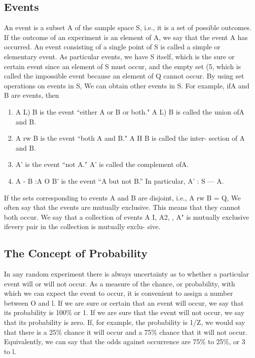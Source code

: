 \subsection*{Events}
An event is a subset A of the sample space S, i.e., it is a set of possible
outcomes. If the outcome of an experiment is an element of A, we say
that the event A has occurred. An event consisting of a single point of S
is called a simple or elementary event.
As particular events, we have S itself, which is the sure or certain
event since an element of S must occur, and the empty set (5, which is
called the impossible event because an element of Q cannot occur.
By using set operations on events in S, We can obtain other events
in S. For example, ifA and B are events, then
\begin{enumerate}
\item A L) B is the event “either A or B or both." A L) B is called the
union ofA and B.
\item A rw B is the event “both A and B." A H B is called the inter-
section of A and B.
\item A’ is the event “not A." A’ is called the complement ofA.
\item  A - B :A O B’ is the event “A but not B.” In particular, A’ :
S — A.
\end{enumerate}
If the sets corresponding to events A and B are disjoint, i.e., A rw B
= Q, We often say that the events are mutually exclusive. This means
that they cannot both occur. We say that a collection of events A I, A2,  ,
A" is mutually exclusive ifevery pair in the collection is mutually exclu-
sive.



\subsection*{The Concept of Probability}
In any random experiment there is always uncertainty as to whether a particular event will or will not occur. As a measure of the chance, or probability, with which we can expect the event to occur, it is convenient to assign a number between O and l. If we are sure or certain that an event will occur, we say that its probability is 100\% or 1. If we are
sure that the event will not occur, we say that its probability is zero. If, for example, the probability is 1/Z, we would say that there is a 25\% chance it will occur and a 75\% chance that it will not occur.
Equivalently, we can say that the odds against occurrence are 75\% to 25\%, or 3 to l.

